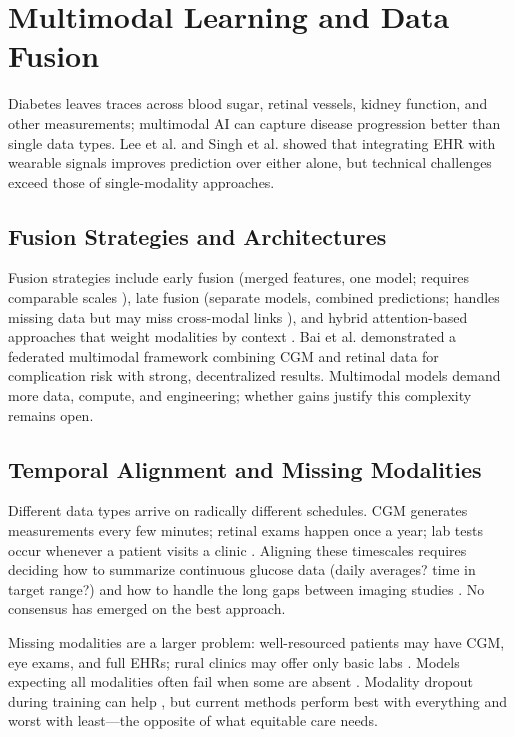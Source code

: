 \section{Multimodal Learning and Data Fusion}

Diabetes leaves traces across blood sugar, retinal vessels, kidney function, and other measurements; multimodal AI can capture disease progression better than single data types. Lee et al. \cite{lee2024multimodal} and Singh et al. \cite{singh2024medfusion} showed that integrating EHR with wearable signals improves prediction over either alone, but technical challenges exceed those of single-modality approaches.

\subsection{Fusion Strategies and Architectures}

Fusion strategies include early fusion (merged features, one model; requires comparable scales \cite{bai2024federated}), late fusion (separate models, combined predictions; handles missing data but may miss cross-modal links \cite{wang2024ai}), and hybrid attention-based approaches that weight modalities by context \cite{contreras2018artificial, wang2024ai, kulkarni2025diabetes, maqsood2025gluconet, xiong2024multimodal}. Bai et al. \cite{bai2024federated} demonstrated a federated multimodal framework combining CGM and retinal data for complication risk with strong, decentralized results. Multimodal models demand more data, compute, and engineering; whether gains justify this complexity remains open.

\subsection{Temporal Alignment and Missing Modalities}

Different data types arrive on radically different schedules. CGM generates measurements every few minutes; retinal exams happen once a year; lab tests occur whenever a patient visits a clinic \cite{contreras2018artificial, oikonomou2023machine}. Aligning these timescales requires deciding how to summarize continuous glucose data (daily averages? time in target range?) and how to handle the long gaps between imaging studies \cite{zhu2021deep}. No consensus has emerged on the best approach.

Missing modalities are a larger problem: well-resourced patients may have CGM, eye exams, and full EHRs; rural clinics may offer only basic labs \cite{mackenzie2023diabetes, ghosh2025artificial}. Models expecting all modalities often fail when some are absent \cite{wang2024ai}. Modality dropout during training can help \cite{bai2024federated}, but current methods perform best with everything and worst with least—the opposite of what equitable care needs.

